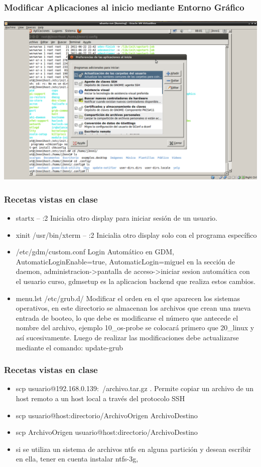 \documentclass{beamer}
\begin{document}
\begin{frame}
\frametitle{Modificar Aplicaciones al inicio mediante Entorno Gr\'afico}
	\includegraphics[height=0.5\textheight]{./imgs/inicio.png} \hspace*{1.0cm}
\end{frame}

\begin{frame}
\frametitle{Recetas vistas en clase}
\begin{itemize}
\item \alert{startx -- :2} Inicialia otro display para iniciar sesión de un usuario.
\item \alert{xinit /usr/bin/xterm -- :2} Inicialia otro display solo con el programa espec\'ifico
\item \alert{/etc/gdm/custom.conf} Login Autom\'atico en GDM, AutomaticLoginEnable=true, AutomaticLogin=miguel en la secci\'on de daemon, administracion->pantalla de acceso->iniciar sesion autom\'atica con el usuario curso, gdmsetup es la aplicacion backend que realiza estos cambios.
\item \alert{menu.lst /etc/grub.d/} Modificar el orden en el que aparecen los sistemas operativos, en este directorio se almacenan los archivos que crean una nueva entrada de booteo, lo que debe es modificarse el n\'umero que antecede el nombre del archivo, ejemplo 10\_os-probe se colocar\'a primero que 20\_linux y as\'i sucesivamente. Luego de realizar las modificaciones debe actualizarse mediante el comando: \alert{update-grub}
\end{itemize}
\end{frame}

\begin{frame}
\frametitle{Recetas vistas en clase}
\begin{itemize}
\item \alert{scp usuario@192.168.0.139:~/archivo.tar.gz .} Permite copiar un archivo de un host remoto a un host local a trav\'es del protocolo SSH
\item scp usuario@host:directorio/ArchivoOrigen ArchivoDestino
\item scp ArchivoOrigen usuario@host:directorio/ArchivoDestino
\item si se utiliza un sistema de archivos ntfs en alguna partici\'on y desean escribir en ella, tener en cuenta instalar ntfs-3g, 
\end{itemize}
\end{frame}
\end{document}
